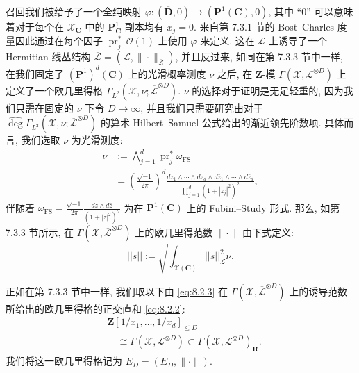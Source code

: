 召回我们被给予了一个全纯映射 \(\varphi: (\overline{\mathbf{D}}, 0) \to (\mathbf{P}^1(\mathbf{C}), 0)\), 
其中 ``0'' 可以意味着对于每个在 \(\mathcal{X}_{\mathbf{C}}\) 中的 \(\mathbf{P}^1_{\mathbf{C}}\) 副本均有 \(x_j = 0\). 
来自第 7.3.1 节的 Bost--Charles 度量因此通过在每个因子 \(\operatorname{pr}^*_j \, \mathcal{O}(1)\) 上使用 \(\varphi\) 来定义. 
这在 \(\mathcal{L}\) 上诱导了一个 Hermitian 线丛结构 \(\overline{\mathcal{L}} = (\mathcal{L}, \|\cdot\|_{\overline{\mathcal{L}}})\), 
并且反过来, 如同在第 7.3.3 节中一样, 在我们固定了 \((\mathbf{P}^1)^d(\mathbf{C})\) 上的光滑概率测度 \(\nu\) 之后, 
在 \(\mathbf{Z}\)-模 \(\Gamma(\mathcal{X}, \mathcal{L}^{\otimes D})\) 上定义了一个欧几里得格 \(\Gamma_{L^2}\left(\mathcal{X}, \nu; \overline{\mathcal{L}}^{\otimes D}\right)\). 
\(\nu\) 的选择对于证明是无足轻重的, 
因为我们只需在固定的 \(\nu\) 下令 \(D \to \infty\), 
并且我们只需要研究由对于 \(\widehat{\deg} \Gamma_{L^2}\left(\mathcal{X}, \nu; \overline{\mathcal{L}}^{\otimes D}\right)\) 
的算术 Hilbert--Samuel 公式给出的渐近领先阶数项. 
具体而言, 我们选取 \(\nu\) 为光滑测度:
\[
\begin{aligned}
\nu &:= \bigwedge_{j=1}^{d} \operatorname{pr}_{j}^{*} \omega_{\mathrm{FS}} \\
&= \left(\frac{\sqrt{-1}}{2\pi}\right)^{d} \frac{dz_{1} \wedge \cdots \wedge dz_{d} \wedge d\bar{z}_{1} \wedge \cdots \wedge d\bar{z}_{d}}{\prod_{j=1}^{d} (1+|z_{j}|^{2})^{2}},
\end{aligned}
\]
伴随着 \(\omega_{\text{FS}} = \frac{\sqrt{-1}}{2\pi} \frac{dz \wedge d\bar{z}}{(1+|z|^2)^2}\) 为在 \(\mathbf{P}^1(\mathbf{C})\) 上的 Fubini--Study 形式. 
那么, 如第 7.3.3 节所示, 在 \(\Gamma\left(\mathcal{X},\overline{\mathcal{L}}^{\otimes D}\right)\) 上的欧几里得范数 \(\|\cdot\|\) 由下式定义:
\begin{equation}\label{eq:8.2.3}
||s|| := \sqrt{\int_{\mathcal{X}(\mathbf{C})} ||s||_{\mathcal{L}}^2 \nu}.
\end{equation}

正如在第 7.3.3 节中一样, 我们取以下由 \eqref{eq:8.2.3} 在 \(\Gamma\left(\mathcal{X}, \overline{\mathcal{L}}^{\otimes D}\right)\) 上的诱导范数所给出的欧几里得格的正交直和 \eqref{eq:8.2.2}:
\[
\begin{aligned}
&\mathbf{Z}[1/x_1,\ldots,1/x_d]_{\leq D} \\
&\quad \cong \Gamma(\mathcal{X},\mathcal{L}^{\otimes D}) \subset \Gamma(\mathcal{X},\mathcal{L}^{\otimes D})_{\mathbf{R}}.
\end{aligned}
\]
我们将这一欧几里得格记为 \(\overline{E}_D = (E_D, \|\cdot\|)\).

